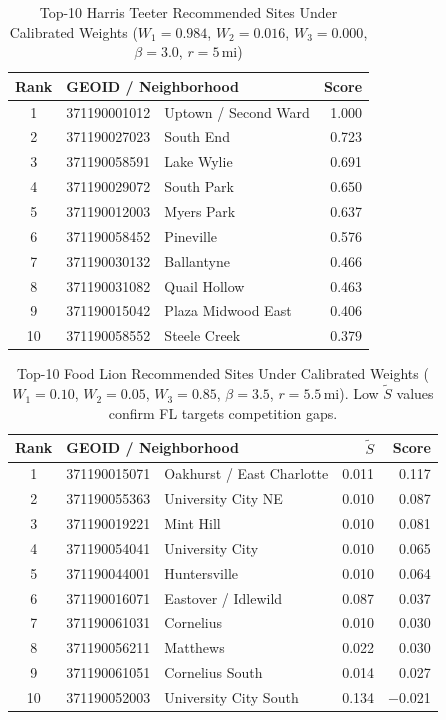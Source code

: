 \documentclass[conference]{IEEEtran}
\begin{document}
\begin{table}[!t]
\centering
\caption{Top-10 Harris Teeter Recommended Sites Under Calibrated Weights
         ($W_1=0.984$, $W_2=0.016$, $W_3=0.000$, $\beta=3.0$, $r=5$\,mi)}
\label{tab:top10_ht}
\begin{tabular}{clr}
\toprule
\textbf{Rank} & \textbf{GEOID / Neighborhood} & \textbf{Score} \\
\midrule
1  & 371190001012\ \ Uptown / Second Ward   & 1.000 \\
2  & 371190027023\ \ South End              & 0.723 \\
3  & 371190058591\ \ Lake Wylie             & 0.691 \\
4  & 371190029072\ \ South Park             & 0.650 \\
5  & 371190012003\ \ Myers Park             & 0.637 \\
6  & 371190058452\ \ Pineville              & 0.576 \\
7  & 371190030132\ \ Ballantyne             & 0.466 \\
8  & 371190031082\ \ Quail Hollow           & 0.463 \\
9  & 371190015042\ \ Plaza Midwood East     & 0.406 \\
10 & 371190058552\ \ Steele Creek           & 0.379 \\
\bottomrule
\end{tabular}
\end{table}

\begin{table}[!t]
\centering
\caption{Top-10 Food Lion Recommended Sites Under Calibrated Weights
         ($W_1=0.10$, $W_2=0.05$, $W_3=0.85$, $\beta=3.5$, $r=5.5$\,mi).
         Low $\widetilde{S}$ values confirm FL targets competition gaps.}
\label{tab:top10_fl}
\begin{tabular}{clrr}
\toprule
\textbf{Rank} & \textbf{GEOID / Neighborhood} & $\widetilde{S}$ & \textbf{Score} \\
\midrule
1  & 371190015071\ \ Oakhurst / East Charlotte & 0.011 & 0.117 \\
2  & 371190055363\ \ University City NE        & 0.010 & 0.087 \\
3  & 371190019221\ \ Mint Hill                 & 0.010 & 0.081 \\
4  & 371190054041\ \ University City           & 0.010 & 0.065 \\
5  & 371190044001\ \ Huntersville              & 0.010 & 0.064 \\
6  & 371190016071\ \ Eastover / Idlewild       & 0.087 & 0.037 \\
7  & 371190061031\ \ Cornelius                 & 0.010 & 0.030 \\
8  & 371190056211\ \ Matthews                  & 0.022 & 0.030 \\
9  & 371190061051\ \ Cornelius South           & 0.014 & 0.027 \\
10 & 371190052003\ \ University City South     & 0.134 & $-$0.021 \\
\bottomrule
\end{tabular}
\end{table}
\end{document}
